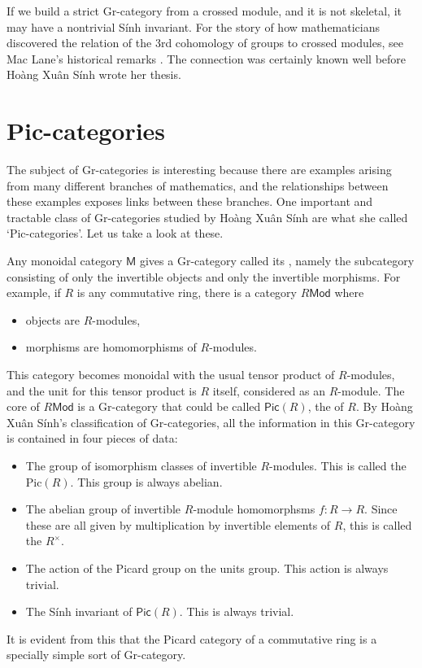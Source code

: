 \documentclass[reqno]{amsart}
\newcommand{\maps}{\colon}    %
\newcommand{\M}{{\mathsf{M}}}   %
\newcommand{\Mod}{\mathsf{Mod}}
\newcommand{\Pic}{\mathsf{Pic}}
\newcommand{\define}[1]{\textbf{\boldmath{#1}}}
\theoremstyle{definition}
\begin{document}
If we build a strict Gr-category from a crossed module, and it is not skeletal,
it may have a nontrivial S\'inh invariant.    For the story of how mathematicians discovered the relation of the 3rd cohomology of groups to crossed modules, see Mac Lane's historical remarks \cite{M79,M88}.  The connection was certainly known well before Ho\`ang Xu\^an S\'inh wrote her thesis.

\section{Pic-categories}
\label{sec:Pic}

The subject of Gr-categories is interesting because there are examples arising from many different branches of mathematics, and the relationships between these examples exposes links between these branches.  One important and tractable class of Gr-categories studied by Ho\`ang Xu\^an S\'inh are what she called `Pic-categories'.  Let us take a look at these.

Any monoidal category $\M$ gives a Gr-category called its \define{core}, namely the subcategory consisting of only the invertible objects and only the invertible morphisms.   For example, if $R$ is any commutative ring, there is a category $R \Mod$ where
\begin{itemize}
\item objects are $R$-modules,
\item morphisms are homomorphisms of $R$-modules.
\end{itemize}
This category becomes monoidal with the usual tensor product of $R$-modules, 
and the unit for this tensor product is $R$ itself, considered
as an $R$-module.  The core of $R \Mod$ is a Gr-category that could
be called $\Pic(R)$, the \define{Picard category} of $R$.  By Ho\`ang Xu\^an S\'inh's
classification of Gr-categories, all the information in this Gr-category is contained in four pieces of
data:
\begin{itemize}
\item 
The group of isomorphism classes of invertible $R$-modules.  This is
called the \define{Picard group} $\mathrm{Pic}(R)$.  This group is always abelian.
\item 
The abelian group of invertible $R$-module homomorphsms $f \maps R \to R$.
Since these are all given by multiplication by invertible elements of $R$, this is
called the \define{units group} $R^\times$.
\item
The action of the Picard group on the units group.  This action is always trivial.
\item
The S\'inh invariant of $\Pic(R)$.  This is always trivial.
\end{itemize}
It is evident from this that the Picard category of a commutative ring is a specially simple sort of Gr-category.
\end{document}
